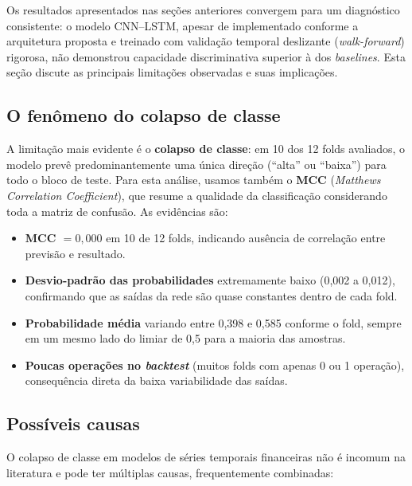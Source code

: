 Os resultados apresentados nas seções anteriores convergem para um diagnóstico consistente:
o modelo CNN--LSTM, apesar de implementado conforme a arquitetura proposta e treinado com
validação temporal deslizante (\textit{walk-forward}) rigorosa, não demonstrou capacidade discriminativa superior
à dos \textit{baselines}. Esta seção discute as principais limitações observadas e suas implicações.

\subsection{O fenômeno do colapso de classe}

A limitação mais evidente é o \textbf{colapso de classe}: em 10 dos 12 folds avaliados,
o modelo prevê predominantemente uma única direção (``alta'' ou ``baixa'') para todo o bloco
de teste. Para esta análise, usamos também o \textbf{MCC} (\textit{Matthews Correlation Coefficient}),
que resume a qualidade da classificação considerando toda a matriz de confusão. As evidências são:

\begin{itemize}
  \item \textbf{MCC $= 0{,}000$} em 10 de 12 folds, indicando ausência de correlação entre
  previsão e resultado.
  \item \textbf{Desvio-padrão das probabilidades} extremamente baixo (0,002 a 0,012),
  confirmando que as saídas da rede são quase constantes dentro de cada fold.
  \item \textbf{Probabilidade média} variando entre 0,398 e 0,585 conforme o fold,
  sempre em um mesmo lado do limiar de 0,5 para a maioria das amostras.
  \item \textbf{Poucas operações no \textit{backtest}} (muitos folds com apenas 0 ou 1 operação),
  consequência direta da baixa variabilidade das saídas.
\end{itemize}

\subsection{Possíveis causas}

O colapso de classe em modelos de séries temporais financeiras não é incomum na literatura
e pode ter múltiplas causas, frequentemente combinadas:

